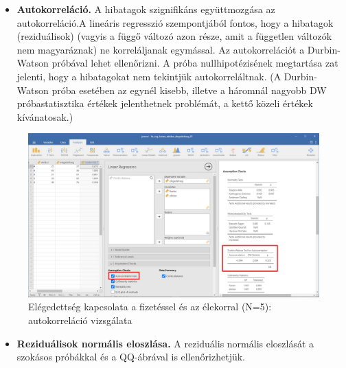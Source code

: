 \documentclass[
  letterpaper,
]{krantz}
\providecommand{\tightlist}{%
  \setlength{\itemsep}{0pt}\setlength{\parskip}{0pt}}\usepackage{longtable,booktabs,array}
\begin{document}
\begin{itemize}
\tightlist
\item
  \textbf{Autokorreláció.} A hibatagok szignifikáns együttmozgása az
  autokorreláció.A lineáris regresszió szempontjából fontos, hogy a
  hibatagok (reziduálisok) (vagyis a függő változó azon része, amit a
  független változók nem magyaráznak) ne korreláljanak egymással. Az
  autokorrelációt a Durbin-Watson próbával lehet ellenőrizni. A próba
  nullhipotézisének megtartása zat jelenti, hogy a hibatagokat nem
  tekintjük autokorreláltnak. (A Durbin-Watson próba esetében az egynél
  kisebb, illetve a háromnál nagyobb DW próbastatisztika értékek
  jelenthetnek problémát, a kettő közeli értékek kívánatosak.)
\end{itemize}

\begin{figure}

{\centering \includegraphics{./images/lin_reg_fizetes_eletkor_elegedettseg_01_kep_09.jpg}

}

\caption{Elégedettség kapcsolata a fizetéssel és az élekorral (N=5):
autokorreláció vizsgálata}

\end{figure}

\begin{itemize}
\tightlist
\item
  \textbf{Reziduálisok normális eloszlása.} A reziduális normális
  eloszlását a szokásos próbákkal és a QQ-ábrával is ellenőrizhetjük.
\end{itemize}
\end{document}
